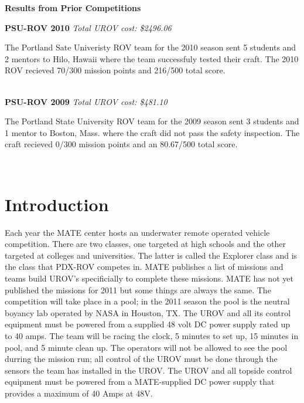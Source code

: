 \documentclass{proposalnsf}
\begin{document}
\newpage


\renewcommand{\thepage} {D--\arabic{page}}

\newpage

\centerline{\bf Results from Prior Competitions}

\noindent
{\bf PSU-ROV 2010}
{\it Total UROV cost: \$2496.06}

The Portland Sate Univeristy ROV team for the 2010 season sent 5 students and 2 mentors to Hilo, Hawaii where the team successfuly tested their craft. The 2010 ROV
recieved 70/300 mission points and 216/500 total score.

\ \\
\noindent
{\bf PSU-ROV 2009}
{\it Total UROV cost: \$481.10}

The Portland State University ROV team for the 2009 season sent 3 students and 1 mentor to Boston, Mass. where the craft did not pass the safety inspection.
The craft recieved 0/300 mission points and an 80.67/500 total score. 


\ \\

\section{Introduction}

Each year the MATE center hosts an underwater remote operated vehicle competition. There are two classes, one targeted at high schools and 
the other targeted at colleges and universities. The latter is called the Explorer class and is the class that PDX-ROV competes in. MATE 
publishes a list of missions and teams build UROV's specificially to complete these missions. MATE has not yet published the missions for 2011
 but some things are always the same. The competition will take place in a pool; in the 2011 season the pool is the neutral boyancy lab
operated by NASA in Houston, TX. The UROV and all its control equipment must be powered from a supplied 48 volt DC power supply rated 
up to 40 amps. The team will be racing the clock, 5 minutes to set up, 15 minutes in pool, and 5 minute clean up. The operators will not 
be allowed to see the pool durring the mission run; all control of the UROV must be done through the sensors the team has installed in the UROV. The UROV and all topside control equipment must be powered from a MATE-supplied DC power supply that provides a maximum of 40 Amps at 48V. 
\end{document}

